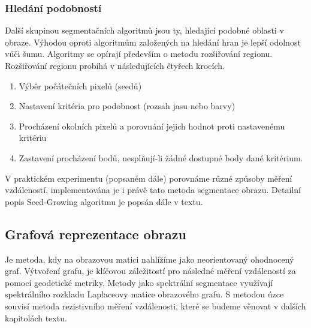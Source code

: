 \documentclass[czech, master, public, dept460, male, cpdeclaration, oneside]{diploma}
\begin{document}
\subsubsection{Hledání podobností}
Další skupinou segmentačních algoritmů jsou ty, hledající podobné oblasti v obraze. Výhodou oproti algoritmům založených na hledání hran je lepší odolnost vůči šumu. Algoritmy se opírají především o metodu rozšiřování regionu. Rozšiřování regionu probíhá v následujících čtyřech krocích. 

\begin{enumerate}
	\item Výběr počátečních pixelů (seedů)
	\item Nastavení kritéria pro podobnost (rozsah jasu nebo barvy)
	\item Procházení okolních pixelů a porovnání jejich hodnot proti nastavenému kritériu
	\item Zastavení procházení bodů, nesplňují-li žádné dostupné body dané kritérium.
\end{enumerate}
\noindent
V praktickém experimentu (popsaném dále) porovnáme různé způsoby měření vzdáleností, implementována je i právě tato metoda segmentace obrazu. Detailní popis Seed-Growing algoritmu je popsán dále v textu.
\newpage
\subsection{Grafová reprezentace obrazu}
Je metoda, kdy na obrazovou matici nahlížíme jako neorientovaný ohodnocený graf. Výtvoření grafu, je klíčovou záležitostí pro následné měření vzdáleností za pomocí geodetické metriky. Metody jako spektrální segmentace využívají spektrálního rozkladu Laplaceovy matice obrazového grafu. S metodou úzce souvisí metoda rezistivního měření vzdálenosti, které se budeme věnovat v dalších kapitolách textu.\par
\end{document}
